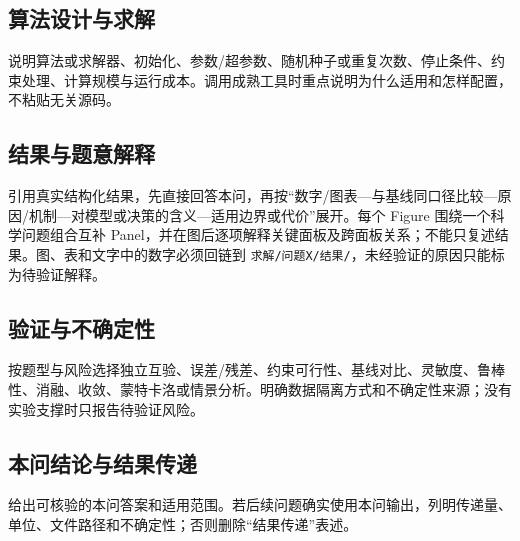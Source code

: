 \subsection{算法设计与求解}

说明算法或求解器、初始化、参数/超参数、随机种子或重复次数、停止条件、约束处理、计算规模与运行成本。调用成熟工具时重点说明为什么适用和怎样配置，不粘贴无关源码。

\subsection{结果与题意解释}

引用真实结构化结果，先直接回答本问，再按“数字/图表—与基线同口径比较—原因/机制—对模型或决策的含义—适用边界或代价”展开。每个 Figure 围绕一个科学问题组合互补 Panel，并在图后逐项解释关键面板及跨面板关系；不能只复述结果。图、表和文字中的数字必须回链到 \texttt{求解/问题X/结果/}，未经验证的原因只能标为待验证解释。

\subsection{验证与不确定性}

按题型与风险选择独立互验、误差/残差、约束可行性、基线对比、灵敏度、鲁棒性、消融、收敛、蒙特卡洛或情景分析。明确数据隔离方式和不确定性来源；没有实验支撑时只报告待验证风险。

\subsection{本问结论与结果传递}

给出可核验的本问答案和适用范围。若后续问题确实使用本问输出，列明传递量、单位、文件路径和不确定性；否则删除“结果传递”表述。

